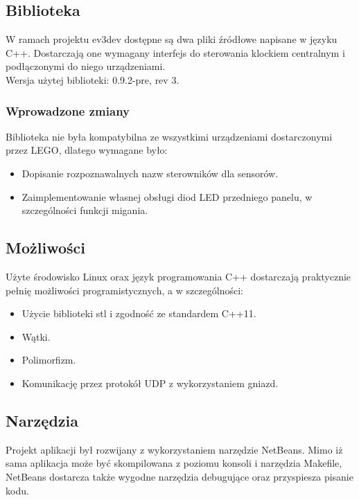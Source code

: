 \subsection{Biblioteka}
W ramach projektu ev3dev dostępne są dwa pliki źródłowe napisane w języku C++. Dostarczają one wymagany interfejs do sterowania klockiem centralnym i podłączonymi do niego urządzeniami.\\

\noindent Wersja użytej biblioteki: 0.9.2-pre, rev 3.

\subsubsection{Wprowadzone zmiany}
Biblioteka nie była kompatybilna ze wszystkimi urządzeniami dostarczonymi przez LEGO, dlatego wymagane było:
\begin{itemize}
    \item Dopisanie rozpoznawalnych nazw sterowników dla sensorów.
    \item Zaimplementowanie własnej obsługi diod LED przedniego panelu, w szczególności funkcji migania.
\end{itemize}

\subsection{Możliwości}
Użyte środowisko Linux orax język programowania C++ dostarczają praktycznie pełnię możliwości programistycznych, a w szczególności:
\begin{itemize}
    \item Użycie biblioteki stl i zgodność ze standardem C++11.
    \item Wątki.
    \item Polimorfizm.
    \item Komunikację przez protokół UDP z wykorzystaniem gniazd.
\end{itemize}

\subsection{Narzędzia}
Projekt aplikacji był rozwijany z wykorzystaniem narzędzie NetBeans. Mimo iż sama aplikacja może być skompilowana z poziomu konsoli i narzędzia Makefile, NetBeans dostarcza także wygodne narzędzia debugujące oraz przyspiesza pisanie kodu.

